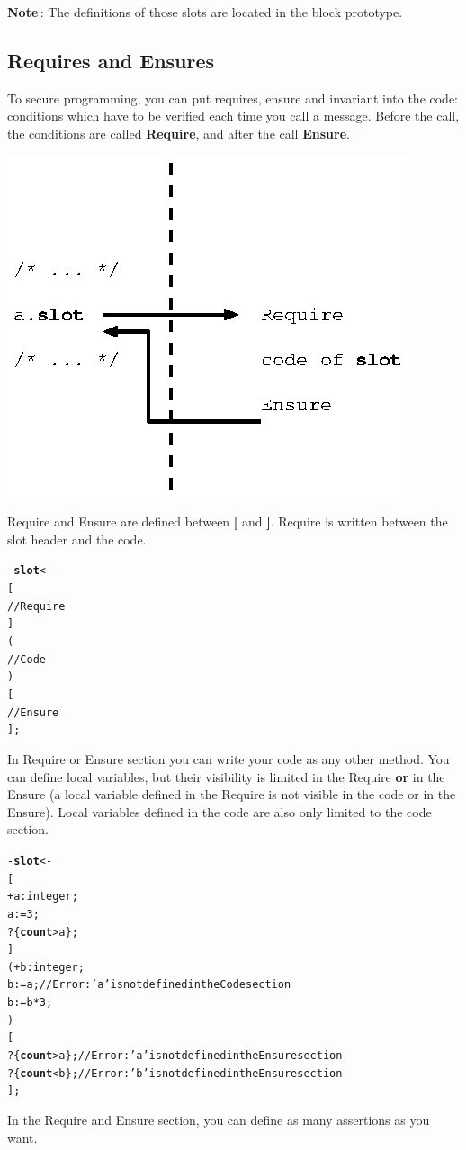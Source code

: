 \documentclass[11pt]{mybook}
\begin{document}
{\bf{}Note}\,: The definitions of those slots are located in the {\sc{}block} prototype.

\subsection{Requires and Ensures}
\label{language_reference:contract:requires_and_ensures}
To secure programming, you can put requires, ensure and invariant into the code: conditions which have to be verified each time you call a message.
Before the call, the conditions are called {\bf{}Require}, and after the call {\bf{}Ensure}.
\begin{center}
\includegraphics[scale=1.3]{figures/require_ensure}
\end{center}
Require and Ensure are defined between {\bf{}[} and {\bf{}]}.
Require is written between the slot header and the code.
\begin{alltt}
  - {\bf{}slot} <-
  [
     // Require
  ]
  (
     // Code
  )
  [
     // Ensure
  ];
\end{alltt}

In Require or Ensure section you can write your code as any other method.
You can define local variables, but their visibility is limited in the Require {\bf{}or} in the Ensure (a local variable defined in the Require is not visible in the code or in the Ensure). Local variables defined in the code are also only limited to the code section.
\begin{alltt}
  - {\bf{}slot} <-
  [
     + a:{\sc{}integer};
     a := 3;
     ? \{{\bf{}count} > a\};
  ]
  (  + b:{\sc{}integer};
     b := a;              // Error: 'a' is not defined in the Code section
     b := b * 3;
   )
  [
     ? \{{\bf{}count} > a\};       // Error: 'a' is not defined in the Ensure section
     ? \{{\bf{}count} < b\};       // Error: 'b' is not defined in the Ensure section 
  ];
\end{alltt}
In the Require and Ensure section, you can define as many assertions as you want.\\
\end{document}
